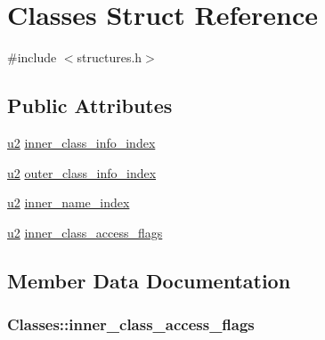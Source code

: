 \hypertarget{structClasses}{}\section{Classes Struct Reference}
\label{structClasses}


{\ttfamily \#include $<$structures.\+h$>$}

\subsection*{Public Attributes}
\begin{DoxyCompactItemize}
\item 
\hyperlink{structures_8h_a55ef8d87fd202b8417704c089899c5b9}{u2} \hyperlink{structClasses_a81deba58ea3d27176396999857216eba}{inner\+\_\+class\+\_\+info\+\_\+index}
\item 
\hyperlink{structures_8h_a55ef8d87fd202b8417704c089899c5b9}{u2} \hyperlink{structClasses_a7437bc55eb998ea0d4eec7b8ebda32c5}{outer\+\_\+class\+\_\+info\+\_\+index}
\item 
\hyperlink{structures_8h_a55ef8d87fd202b8417704c089899c5b9}{u2} \hyperlink{structClasses_ae675c3ce50aa5f7714c632aef5b004b9}{inner\+\_\+name\+\_\+index}
\item 
\hyperlink{structures_8h_a55ef8d87fd202b8417704c089899c5b9}{u2} \hyperlink{structClasses_ad90d20687902aa92ca1c6fa8f03b0302}{inner\+\_\+class\+\_\+access\+\_\+flags}
\end{DoxyCompactItemize}


\subsection{Member Data Documentation}
\subsubsection[{\texorpdfstring{inner\+\_\+class\+\_\+access\+\_\+flags}{inner_class_access_flags}}]{ Classes\+::inner\+\_\+class\+\_\+access\+\_\+flags}\hypertarget{structClasses_ad90d20687902aa92ca1c6fa8f03b0302}{}\label{structClasses_ad90d20687902aa92ca1c6fa8f03b0302}
